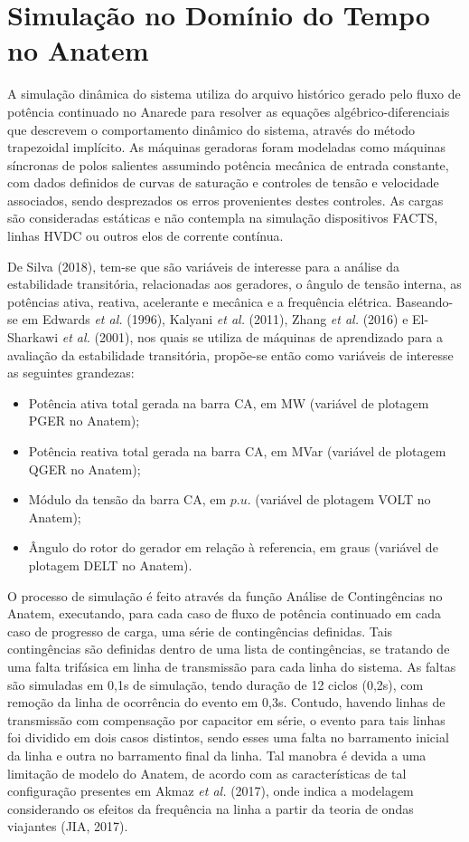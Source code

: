 \documentclass[12pt,oneside,a4paper,chapter=TITLE,section=TITLE,sumario=tradicional,english,brazil]{abntex2}
\begin{document}
\section{Simulação no Domínio do Tempo no Anatem}
A simulação dinâmica do sistema utiliza do arquivo histórico gerado pelo fluxo de potência continuado no Anarede para resolver as equações algébrico-diferenciais que descrevem o comportamento dinâmico do sistema, através do método trapezoidal implícito. As máquinas geradoras foram modeladas como máquinas síncronas de polos salientes assumindo potência mecânica de entrada constante, com dados definidos de curvas de saturação e controles de tensão e velocidade associados, sendo desprezados os erros provenientes destes controles. As cargas são consideradas estáticas e não contempla na simulação dispositivos FACTS, linhas HVDC ou outros elos de corrente contínua.\par  
De Silva (2018), tem-se que são variáveis de interesse para a análise da estabilidade transitória, relacionadas aos geradores, o ângulo de tensão interna, as potências ativa, reativa, acelerante e mecânica e a frequência elétrica. Baseando-se em Edwards \textit{et al.} (1996), Kalyani \textit{et al.} (2011), Zhang \textit{et al.} (2016) e El-Sharkawi \textit{et al.} (2001), nos quais se utiliza de máquinas de aprendizado para a avaliação da estabilidade transitória, propõe-se então como variáveis de interesse as seguintes grandezas:
\begin{itemize}
\item Potência ativa total gerada na barra CA, em MW (variável de plotagem PGER no Anatem);
\item Potência reativa total gerada na barra CA, em MVar (variável de plotagem QGER no Anatem);
\item Módulo da tensão da barra CA, em $p.u.$ (variável de plotagem VOLT no Anatem);
\item Ângulo do rotor do gerador em relação à referencia, em graus (variável de plotagem DELT no Anatem).
\end{itemize}
\par 
O processo de simulação é feito através da função Análise de Contingências no Anatem, executando, para cada caso de fluxo de potência continuado em cada caso de progresso de carga, uma série de contingências definidas. Tais contingências são definidas dentro de uma lista de contingências, se tratando de uma falta trifásica em linha de transmissão para cada linha do sistema. As faltas são simuladas em 0,1s de simulação, tendo duração de 12 ciclos (0,2s), com remoção da linha de ocorrência do evento em 0,3s. Contudo, havendo linhas de transmissão com compensação por capacitor em série, o evento para tais linhas foi dividido em dois casos distintos, sendo esses uma falta no barramento inicial da linha e outra no barramento final da linha. Tal manobra é devida a uma limitação de modelo do Anatem, de acordo com as características de tal configuração presentes em Akmaz \textit{et al.} (2017), onde indica a modelagem considerando os efeitos da frequência na linha a partir da teoria de ondas viajantes (JIA, 2017).\par 
\end{document}
